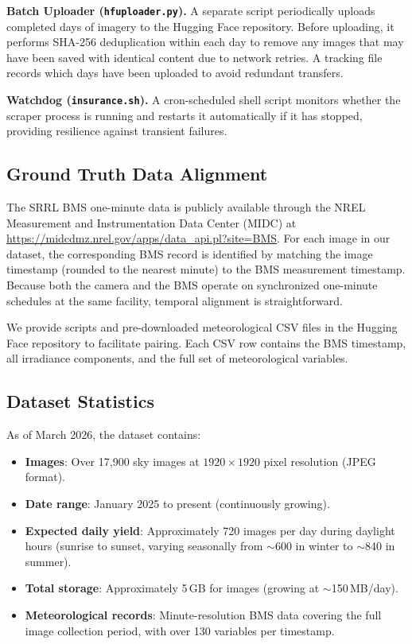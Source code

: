 \documentclass[twoside,11pt]{article}
\begin{document}
\textbf{Batch Uploader (\texttt{hfuploader.py}).} A separate script periodically uploads completed days of imagery to the Hugging Face repository. Before uploading, it performs SHA-256 deduplication within each day to remove any images that may have been saved with identical content due to network retries. A tracking file records which days have been uploaded to avoid redundant transfers.

\textbf{Watchdog (\texttt{insurance.sh}).} A cron-scheduled shell script monitors whether the scraper process is running and restarts it automatically if it has stopped, providing resilience against transient failures.

\subsection{Ground Truth Data Alignment}

The SRRL BMS one-minute data is publicly available through the NREL Measurement and Instrumentation Data Center (MIDC) at \url{https://midcdmz.nrel.gov/apps/data_api.pl?site=BMS}. For each image in our dataset, the corresponding BMS record is identified by matching the image timestamp (rounded to the nearest minute) to the BMS measurement timestamp. Because both the camera and the BMS operate on synchronized one-minute schedules at the same facility, temporal alignment is straightforward.

We provide scripts and pre-downloaded meteorological CSV files in the Hugging Face repository to facilitate pairing. Each CSV row contains the BMS timestamp, all irradiance components, and the full set of meteorological variables.

\subsection{Dataset Statistics}

As of March 2026, the dataset contains:
\begin{itemize}
    \item \textbf{Images}: Over 17,900 sky images at $1920 \times 1920$ pixel resolution (JPEG format).
    \item \textbf{Date range}: January 2025 to present (continuously growing).
    \item \textbf{Expected daily yield}: Approximately 720 images per day during daylight hours (sunrise to sunset, varying seasonally from $\sim$600 in winter to $\sim$840 in summer).
    \item \textbf{Total storage}: Approximately 5\,GB for images (growing at $\sim$150\,MB/day).
    \item \textbf{Meteorological records}: Minute-resolution BMS data covering the full image collection period, with over 130 variables per timestamp.
\end{itemize}
\end{document}
